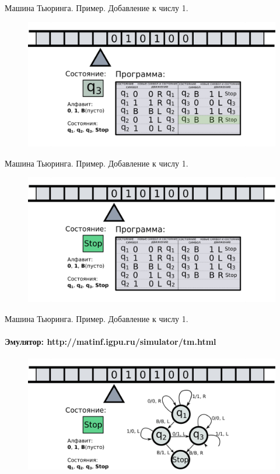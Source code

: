 \documentclass[newPxFont]{beamer}
\begin{document}
\begin{frame}{Машина Тьюринга. Пример. Добавление к числу 1.}
	\begin{figure}
		\centerline{\includegraphics[width=1.5\linewidth]{images/tm_ex_15.png}}
	\end{figure}
\end{frame}


\begin{frame}{Машина Тьюринга. Пример. Добавление к числу 1.}
	\begin{figure}
		\centerline{\includegraphics[width=1.5\linewidth]{images/tm_ex_16.png}}
	\end{figure}
\end{frame}

\begin{frame}{Машина Тьюринга. Пример. Добавление к числу 1.}
\framesubtitle{Эмулятор: http://matinf.igpu.ru/simulator/tm.html}
	\begin{figure}
		\centerline{\includegraphics[width=1.5\linewidth]{images/tm_ex_graph.png}}
	\end{figure}
\end{frame}
\end{document}

